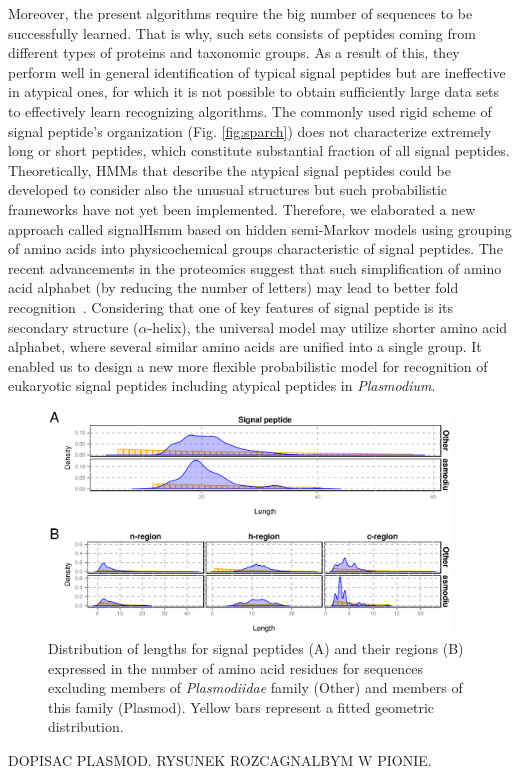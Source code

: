 \documentclass[10pt,letterpaper]{article}
\begin{document}
Moreover, the present algorithms require the big number of sequences to be successfully learned. That is why, such sets consists of peptides coming from different types of proteins and taxonomic groups. As a result of this, they perform well in general identification of typical signal peptides but are ineffective in atypical ones, for which it is not possible to obtain sufficiently large data sets to effectively learn recognizing algorithms. The commonly used rigid scheme of signal peptide's organization (Fig. \ref{fig:sparch}) does not characterize extremely long or short peptides, which constitute substantial fraction of all signal peptides. Theoretically, HMMs that describe the atypical signal peptides could be developed to consider also the unusual structures but such probabilistic frameworks have not yet been implemented. Therefore, we elaborated a new approach called signalHsmm based on hidden semi-Markov models using grouping of amino acids into physicochemical groups characteristic of signal peptides. The recent advancements in the proteomics suggest that such simplification of amino acid alphabet (by reducing the number of letters) may lead to better fold recognition~\cite{2000murphysimplified, 2009petersonreduced}. Considering that one of key features of signal peptide is its secondary structure ($\alpha$-helix), the universal model may utilize shorter amino acid alphabet, where several similar amino acids are unified into a single group. It enabled us to design a new more flexible probabilistic model for recognition of eukaryotic signal peptides including atypical peptides in \textsl{Plasmodium}.



\begin{figure}[ht]\centering
\includegraphics[width=0.95\textwidth]{figures/reglen.eps}
\caption{Distribution of lengths for signal peptides (A) and their regions (B) expressed in the number of amino acid residues for sequences excluding members of \textit{Plasmodiidae} family (Other) and members of this family (Plasmod). Yellow bars represent a fitted geometric distribution.}
\label{fig:reglen}
\end{figure}
DOPISAC PLASMOD. RYSUNEK ROZCAGNALBYM W PIONIE.
\end{document}
